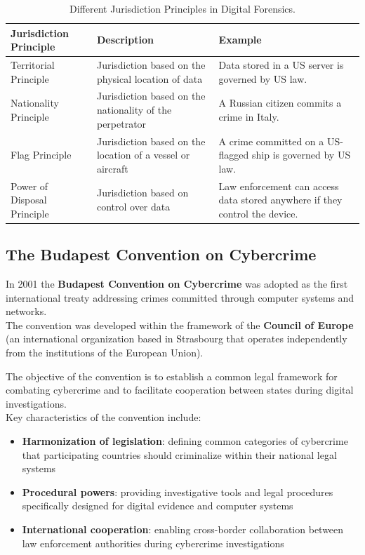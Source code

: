 \begin{table}[H]
\centering
\small
\begin{tabular}{|p{3.5cm}|p{5cm}|p{3.2cm}|}
\hline
\textbf{Jurisdiction Principle} & \textbf{Description} & \textbf{Example} \\
\hline
Territorial Principle & Jurisdiction based on the physical location of data & Data stored in a US server is governed by US law. \\
Nationality Principle & Jurisdiction based on the nationality of the perpetrator & A Russian citizen commits a crime in Italy. \\
Flag Principle & Jurisdiction based on the location of a vessel or aircraft & A crime committed on a US-flagged ship is governed by US law. \\
Power of Disposal Principle & Jurisdiction based on control over data & Law enforcement can access data stored anywhere if they control the device. \\
\hline
\end{tabular}
\caption{Different Jurisdiction Principles in Digital Forensics.}
\end{table}

\subsection{The Budapest Convention on Cybercrime}

In 2001 the \textbf{Budapest Convention on Cybercrime} was adopted as the first international treaty addressing crimes committed through computer systems and networks.\\
The convention was developed within the framework of the \textbf{Council of Europe} (an international organization based in Strasbourg that operates independently from the institutions of the European Union).
\medskip

\noindent
The objective of the convention is to establish a common legal framework for combating cybercrime and to facilitate cooperation between states during digital investigations.\\
Key characteristics of the convention include:

\begin{itemize}
\item \textbf{Harmonization of legislation}: defining common categories of cybercrime that participating countries should criminalize within their national legal systems
\item \textbf{Procedural powers}: providing investigative tools and legal procedures specifically designed for digital evidence and computer systems
\item \textbf{International cooperation}: enabling cross-border collaboration between law enforcement authorities during cybercrime investigations
\end{itemize}

